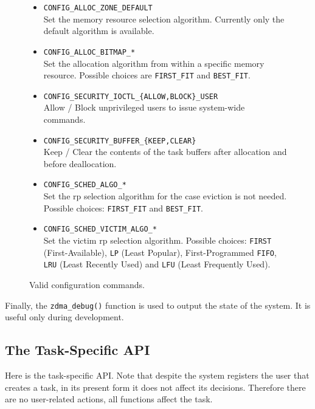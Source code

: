 \begin{figure}[htb!]
\begin{itemize}
\item	\texttt{CONFIG\_ALLOC\_ZONE\_DEFAULT}\\
	Set the memory resource selection algorithm.
	Currently only the default algorithm is available.

\item	\texttt{CONFIG\_ALLOC\_BITMAP\_*}\\
	Set the allocation algorithm from within a specific memory resource.
	Possible choices are \texttt{FIRST\_FIT} and \texttt{BEST\_FIT}.

\item	\texttt{CONFIG\_SECURITY\_IOCTL\_\{ALLOW,BLOCK\}\_USER}\\
	Allow / Block unprivileged users to issue system-wide commands.

\item	\texttt{CONFIG\_SECURITY\_BUFFER\_\{KEEP,CLEAR\}}\\
	Keep / Clear the contents of the task buffers after allocation and before deallocation.

\item	\texttt{CONFIG\_SCHED\_ALGO\_*}\\
	Set the \gls{rp} selection algorithm for the case eviction is not needed.
	Possible choices: \texttt{FIRST\_FIT} and \texttt{BEST\_FIT}.

\item	\texttt{CONFIG\_SCHED\_VICTIM\_ALGO\_*}\\
	Set the victim \gls{rp} selection algorithm.
	Possible choices: \texttt{FIRST} (First-Available), \texttt{LP} (Least Popular),
	First-Programmed \texttt{FIFO}, \texttt{LRU} (Least Recently Used) and \texttt{LFU} (Least Frequently Used).
\end{itemize}
\caption{Valid configuration commands.}
\label{fig:config}
\end{figure}

Finally, the \texttt{zdma\_debug()} function is used to output the state of the system.
It is useful only during development.

\subsection{The Task-Specific API}
\label{sec:sw-api-task}

Here is the task-specific API. Note that despite the system registers the user
that creates a task, in its present form it does not affect its decisions.
Therefore there are no user-related actions, all functions affect the task.


